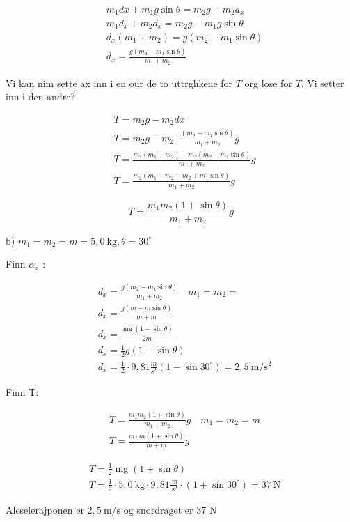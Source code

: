 \documentclass[10pt]{article}
\begin{document}
$$
\begin{aligned}
& m_{1} d x+m_{1} g \sin \theta=m_{2} g-m_{2} a_{x} \\
& m_{1} d_{x}+m_{2} d_{x}=m_{2} g-m_{1} g \sin \theta \\
& d_{x}\left(m_{1}+m_{2}\right)=g\left(m_{2}-m_{1} \sin \theta\right) \\
& d_{x}=\frac{g\left(m_{2}-m_{1} \sin \theta\right)}{m_{1}+m_{2}}
\end{aligned}
$$

Vi kan nim sette ax inn i en our de to uttrghkene for $T$ org lose for $T$. Vi setter inn i den andre?

$$
\begin{aligned}
& T=m_{2} g-m_{2} d x \\
& T=m_{2} g-m_{2} \cdot \frac{\left(m_{2}-m_{1} \sin \theta\right)}{m_{1}+m_{2}} g \\
& T=\frac{m_{2}\left(m_{1}+m_{2}\right)-m_{2}\left(m_{2}-m_{1} \sin \theta\right)}{m_{1}+m_{2}} g \\
& T=\frac{m_{2}\left(m_{1}+m_{2}-m_{2}+m_{1} \sin \theta\right)}{m_{1}+m_{2}} g
\end{aligned}
$$

$$
T=\frac{m_{1} m_{2}(1+\sin \theta)}{m_{1}+m_{2}} g
$$

b) $m_{1}=m_{2}=m=5,0 \mathrm{~kg}, \theta=30^{\circ}$

Finn $\alpha_{x}$ :

$$
\begin{aligned}
& d_{x}=\frac{g\left(m_{2}-m_{1} \sin \theta\right)}{m_{1}+m_{2}} \quad m_{1}=m_{2}= \\
& d_{x}=\frac{g(m-m \sin \theta)}{m+m} \\
& d_{x}=\frac{\operatorname{mg}(1-\sin \theta)}{2 m} \\
& d_{x}=\frac{1}{2} g(1-\sin \theta) \\
& d_{x}=\frac{1}{2} \cdot 9,81 \frac{m}{s^{2}}\left(1-\sin 30^{\circ}\right)=2,5 \mathrm{~m} / \mathrm{s}^{2}
\end{aligned}
$$

Finn T:

$$
\begin{aligned}
& T=\frac{m_{1} m_{2}(1+\sin \theta)}{m_{1}+m_{2}} g \quad m_{1}=m_{2}=m \\
& T=\frac{m \cdot m(1+\sin \theta)}{m+m} g
\end{aligned}
$$

$$
\begin{aligned}
& T=\frac{1}{2} \operatorname{mg}(1+\sin \theta) \\
& T=\frac{1}{2} \cdot 5,0 \mathrm{~kg} \cdot 9,81 \frac{\mathrm{~m}}{\mathrm{~s}^{2}} \cdot\left(1+\sin 30^{\circ}\right)=37 \mathrm{~N}
\end{aligned}
$$

Aleselerajponen er $2,5 \mathrm{~m} / \mathrm{s}$ og snordraget er 37 N
\end{document}
